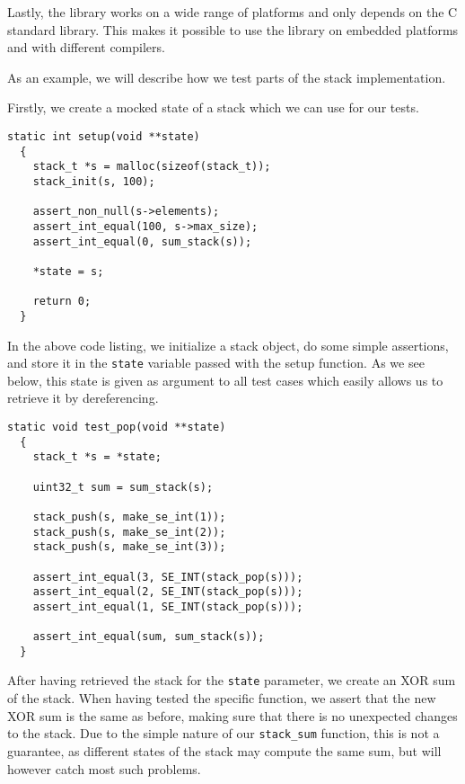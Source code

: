 Lastly, the library works on a wide range of platforms and only depends on the C
standard library. This makes it possible to use the library on embedded
platforms and with different compilers.

As an example, we will describe how we test parts of the stack implementation.

Firstly, we create a mocked state of a stack which we can use for our tests.

\begin{lstlisting}[language={[ANSI]C},caption={Unit-test setup procedure}]
  static int setup(void **state)
  {
    stack_t *s = malloc(sizeof(stack_t));
    stack_init(s, 100);

    assert_non_null(s->elements);
    assert_int_equal(100, s->max_size);
    assert_int_equal(0, sum_stack(s));

    *state = s;

    return 0;
  }
\end{lstlisting}

In the above code listing, we initialize a stack object, do some simple
assertions, and store it in the {\tt state} variable passed with the setup
function. As we see below, this state is given as argument to all test cases
which easily allows us to retrieve it by dereferencing.

\begin{lstlisting}[language={[ANSI]C},caption={Unit-test of {\tt stack\_pop}}]
  static void test_pop(void **state)
  {
    stack_t *s = *state;

    uint32_t sum = sum_stack(s);

    stack_push(s, make_se_int(1));
    stack_push(s, make_se_int(2));
    stack_push(s, make_se_int(3));

    assert_int_equal(3, SE_INT(stack_pop(s)));
    assert_int_equal(2, SE_INT(stack_pop(s)));
    assert_int_equal(1, SE_INT(stack_pop(s)));

    assert_int_equal(sum, sum_stack(s));
  }
\end{lstlisting}

After having retrieved the stack for the {\tt state} parameter, we create an XOR
sum of the stack. When having tested the specific function, we assert that the
new XOR sum is the same as before, making sure that there is no unexpected
changes to the stack. Due to the simple nature of our {\tt stack\_sum} function,
this is not a guarantee, as different states of the stack may compute the same
sum, but will however catch most such problems.


